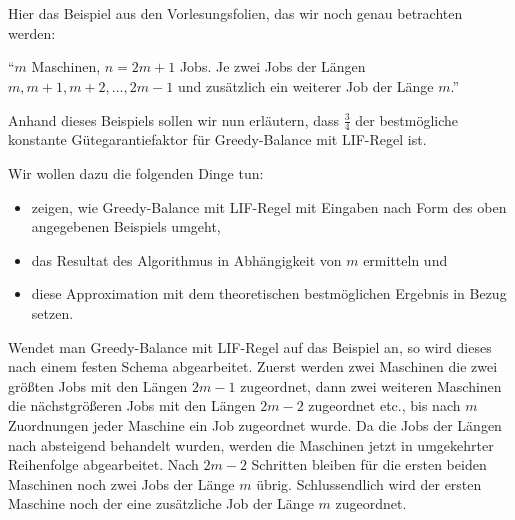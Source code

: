 \documentclass[a4paper]{article}
\begin{document}
		
	\section{}
	
	Hier das Beispiel aus den Vorlesungsfolien, das wir noch genau betrachten werden: \n
	
	"`$m$ Maschinen, $n = 2m + 1$ Jobs. Je zwei Jobs der Längen $m, m + 1, m + 2, \dots , 2m - 1$ und zusätzlich ein weiterer Job der Länge $m$."' \n
	
	Anhand dieses Beispiels sollen wir nun erläutern, dass $\frac{3}{4}$ der bestmögliche konstante Gütegarantiefaktor für Greedy-Balance mit LIF-Regel ist. \n
	
	Wir wollen dazu die folgenden Dinge tun:
	\begin{itemize}
	\item zeigen, wie Greedy-Balance mit LIF-Regel mit Eingaben nach Form des oben angegebenen Beispiels umgeht,
	\item das Resultat des Algorithmus in Abhängigkeit von $m$ ermitteln und
	\item diese Approximation mit dem theoretischen bestmöglichen Ergebnis in Bezug setzen.
	\end{itemize}
	
	Wendet man Greedy-Balance mit LIF-Regel auf das Beispiel an, so wird dieses nach einem festen Schema abgearbeitet. Zuerst werden zwei Maschinen die zwei größten Jobs mit den Längen $2m -1$ zugeordnet, dann zwei weiteren Maschinen die nächstgrößeren Jobs mit den Längen $2m - 2$ zugeordnet etc., bis nach $m$ Zuordnungen jeder Maschine ein Job zugeordnet wurde. Da die Jobs der Längen nach absteigend behandelt wurden, werden die Maschinen jetzt in umgekehrter Reihenfolge abgearbeitet. Nach $2m - 2$ Schritten bleiben für die ersten beiden Maschinen noch zwei Jobs der Länge $m$ übrig. Schlussendlich wird der ersten Maschine noch der eine zusätzliche Job der Länge $m$ zugeordnet. \n
	
\end{document}
